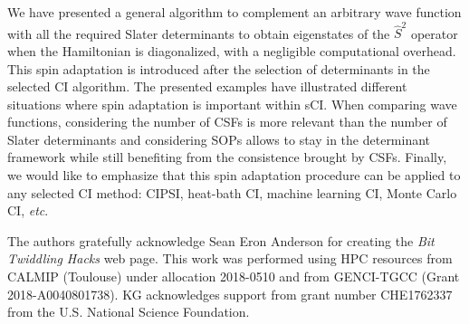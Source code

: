 \documentclass[aip,jcp,reprint,showkeys]{revtex4-1}
\newcommand{\stwo}{\hat{S}^2}
\newcommand{\sop}{SOP}
\newcommand{\csf}{CSF}
\newcommand{\sci}{sCI}
\begin{document}
We have presented a general algorithm to complement an arbitrary wave function
with all the required Slater determinants to obtain eigenstates of the $\stwo$
operator when the Hamiltonian is diagonalized, with a negligible computational
overhead. This spin adaptation is introduced after the selection of
determinants in the selected CI algorithm.
The presented examples have illustrated different situations where
spin adaptation is important within {\sci}.  When comparing wave functions, considering the
number of {\csf s} is more relevant than the number of Slater determinants and
considering {\sop s} allows to stay in the determinant framework while still
benefiting from the consistence brought by {\csf s}.
Finally, we would like to emphasize that this spin adaptation procedure can be
applied to any selected CI method: CIPSI, heat-bath CI, machine learning CI,
Monte Carlo CI, \textit{etc}.


\begin{acknowledgments}
The authors gratefully acknowledge Sean Eron Anderson for creating the 
\emph{Bit Twiddling Hacks} web page.
This work was performed using HPC resources from CALMIP (Toulouse) under
allocation 2018-0510 and from GENCI-TGCC (Grant 2018-A0040801738).
KG acknowledges support from grant number CHE1762337 from the U.S. National Science Foundation.
\end{acknowledgments}



\end{document}

